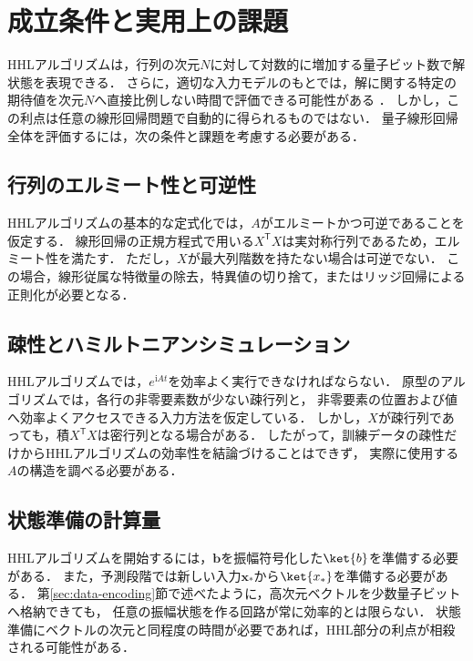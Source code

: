 \section{成立条件と実用上の課題}
\label{sec:hhl-assumptions-and-limitations}

HHLアルゴリズムは，行列の次元$N$に対して対数的に増加する量子ビット数で解状態を表現できる．
さらに，適切な入力モデルのもとでは，解に関する特定の期待値を次元$N$へ直接比例しない時間で評価できる可能性がある
\cite{shimada2020}．
しかし，この利点は任意の線形回帰問題で自動的に得られるものではない．
量子線形回帰全体を評価するには，次の条件と課題を考慮する必要がある．

\subsection{行列のエルミート性と可逆性}
\label{subsec:hermiticity-and-invertibility}

HHLアルゴリズムの基本的な定式化では，$A$がエルミートかつ可逆であることを仮定する．
線形回帰の正規方程式で用いる$X^{\mathsf{T}}X$は実対称行列であるため，エルミート性を満たす．
ただし，$X$が最大列階数を持たない場合は可逆でない．
この場合，線形従属な特徴量の除去，特異値の切り捨て，またはリッジ回帰による正則化が必要となる．

\subsection{疎性とハミルトニアンシミュレーション}
\label{subsec:sparsity-and-hamiltonian-simulation}

HHLアルゴリズムでは，$e^{\mathrm{i}At}$を効率よく実行できなければならない．
原型のアルゴリズムでは，各行の非零要素数が少ない疎行列と，
非零要素の位置および値へ効率よくアクセスできる入力方法を仮定している\cite{shimada2020}．
しかし，$X$が疎行列であっても，積$X^{\mathsf{T}}X$は密行列となる場合がある．
したがって，訓練データの疎性だけからHHLアルゴリズムの効率性を結論づけることはできず，
実際に使用する$A$の構造を調べる必要がある．

\subsection{状態準備の計算量}
\label{subsec:state-preparation-cost}

HHLアルゴリズムを開始するには，$\bm{b}$を振幅符号化した$\ket{b}$を準備する必要がある．
また，予測段階では新しい入力$\bm{x}_{*}$から$\ket{x_{*}}$を準備する必要がある．
第\ref{sec:data-encoding}節で述べたように，高次元ベクトルを少数量子ビットへ格納できても，
任意の振幅状態を作る回路が常に効率的とは限らない．
状態準備にベクトルの次元と同程度の時間が必要であれば，HHL部分の利点が相殺される可能性がある．

